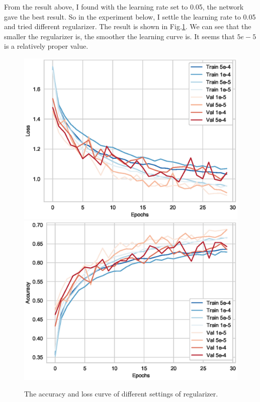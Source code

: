 \documentclass[11pt]{article}
\begin{document}
\begin{enumerate}
\begin{enumerate}
    From the result above, I found with the learning rate set to 0.05, the network gave the best result. So in the experiment below, I settle the learning rate to 0.05 and tried different regularizer. The result is shown in Fig.\ref{fig:var_reg}. We can see that the smaller the regularizer is, the smoother the learning curve is.  It seems that $5e-5$ is a relatively proper value.
    \begin{figure}[h]
        \centering
        \includegraphics[width=0.45\linewidth]{REG_BN_var_loss.eps}
        \includegraphics[width=0.45\linewidth]{REG_BN_var.eps}
        \caption{The accuracy and loss curve of different settings of regularizer.}
        \label{fig:var_reg}
    \end{figure}
\end{enumerate}

\end{enumerate}
\end{document}
